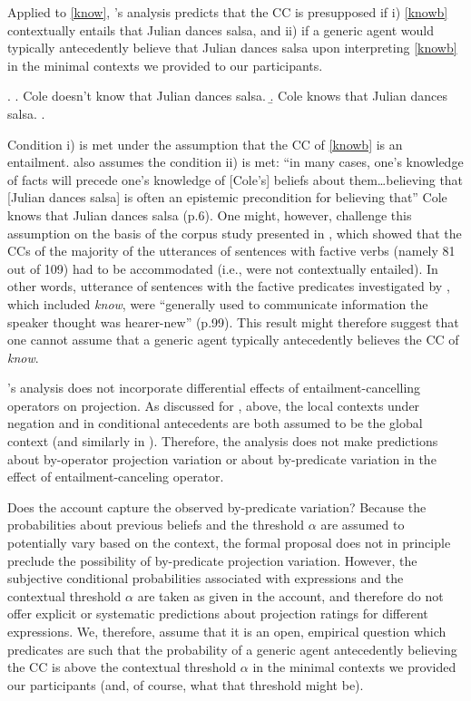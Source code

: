 \documentclass[a4paper,12pt,twoside]{article}
\newcommand{\poscite}[1]{\citeauthor{#1}'s \citeyear{#1}}
\begin{document}
	Applied to \ref{know}, \poscite{schlenker_triggering_2021} analysis predicts that the CC  is presupposed if i) \ref{knowb} contextually entails that Julian dances salsa, and ii) if a generic agent would typically antecedently believe that Julian dances salsa upon interpreting \ref{knowb} in the minimal contexts we provided to our participants.

	\ex.\label{know} 
	\a.\label{knowa} Cole doesn't know that Julian dances salsa.
	\b.\label{knowb} Cole knows that Julian dances salsa.
	\z.

	Condition i) is met under the assumption that the CC of \ref{knowb} is an entailment. \citealt{schlenker_triggering_2021} also assumes the condition ii) is met: ``in many cases, one's knowledge of facts will precede one's knowledge of [Cole's] beliefs about them\ldots believing that [Julian dances salsa] is often an epistemic precondition for believing that'' Cole knows that Julian dances salsa (p.6). One might, however, challenge this assumption on the basis of the corpus study presented in \citealt{spenader_presuppositions_2002}, which showed that the CCs of the majority of the utterances of sentences with factive verbs (namely 81 out of 109) had to be accommodated (i.e., were not contextually entailed). In other words, utterance of sentences with the factive predicates investigated by \citet{spenader_presuppositions_2002}, which included \emph{know}, were ``generally used to communicate information the speaker thought was hearer-new'' (p.99). This result might therefore suggest that one cannot assume that a generic agent typically antecedently believes the CC of {\em know}.

    \poscite{schlenker_triggering_2021} analysis does not incorporate differential effects of entailment-cancelling operators on projection. As discussed for \citealt{heim_projection_1983}, above, the local contexts under negation and in conditional antecedents are both assumed to be the global context (and similarly in \citealt{schlenker_local_2009}). Therefore, the analysis does not make predictions about by-operator projection variation or about by-predicate variation in the effect of entailment-canceling operator.

    Does the account capture the observed by-predicate variation?
    Because the probabilities about previous beliefs and the threshold $\alpha$ are assumed to potentially vary based on the context, the formal proposal does not in principle preclude the possibility of by-predicate projection variation. However, the subjective conditional probabilities associated with expressions and the contextual threshold $\alpha$ are taken as given in the account, and therefore do not offer explicit or systematic predictions about projection ratings for different expressions.
    We, therefore, assume that it is an open, empirical question which predicates are such that the probability of a generic agent antecedently believing the CC is above the contextual threshold $\alpha$ in the minimal contexts we provided our participants (and, of course, what that threshold might be).
    
\end{document}
